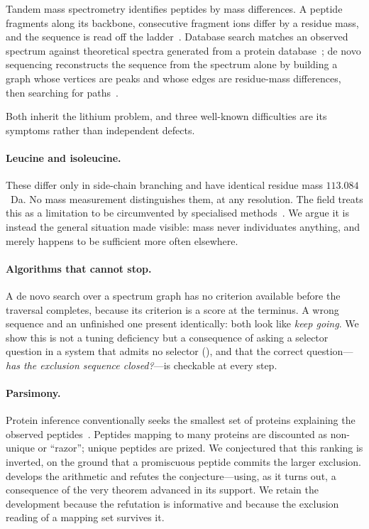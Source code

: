 \documentclass[11pt,a4paper]{article}
\theoremstyle{definition}
\theoremstyle{remark}
\begin{document}
Tandem mass spectrometry identifies peptides by mass differences.
A peptide fragments along its backbone, consecutive fragment ions differ
by a residue mass, and the sequence is read off the
ladder~\citep{roepstorff1984proposal,paizs2005fragmentation}. Database
search matches an observed spectrum against theoretical spectra generated
from a protein
database~\citep{eng1994approach,perkins1999probability,cox2008maxquant};
de novo sequencing reconstructs the sequence from the spectrum alone by
building a graph whose vertices are peaks and whose edges are residue-mass
differences, then searching for
paths~\citep{dancik1999novo,frank2005pepnovo,ma2003peaks,tran2017novo}.

Both inherit the lithium problem, and three well-known difficulties are
its symptoms rather than independent defects.

\paragraph{Leucine and isoleucine.} These differ only in side-chain
branching and have identical residue mass $113.084$~Da. No mass
measurement distinguishes them, at any resolution. The field treats this
as a limitation to be circumvented by specialised
methods~\citep{xiao2016distinguishing,zhokhov2017distinguishing}. We
argue it is instead the general situation made visible: mass never
individuates anything, and merely happens to be sufficient more often
elsewhere.

\paragraph{Algorithms that cannot stop.} A de novo search over a spectrum
graph has no criterion available before the traversal completes, because
its criterion is a score at the terminus. A wrong sequence and an
unfinished one present identically: both look like \emph{keep going}. We
show this is not a tuning deficiency but a consequence of asking a
selector question in a system that admits no selector
(), and that the correct question---\emph{has the
exclusion sequence closed?}---is checkable at every step.

\paragraph{Parsimony.} Protein inference conventionally seeks the
smallest set of proteins explaining the observed
peptides~\citep{nesvizhskii2003statistical,nesvizhskii2005interpretation,huang2012protein}.
Peptides mapping to many proteins are discounted as non-unique or
``razor''; unique peptides are prized. We conjectured that this ranking
is inverted, on the ground that a promiscuous peptide commits the larger
exclusion.  develops the arithmetic and
 refutes the conjecture---using, as it turns out,
a consequence of the very theorem advanced in its support. We retain the
development because the refutation is informative and because the
exclusion reading of a mapping set survives it.
\end{document}
